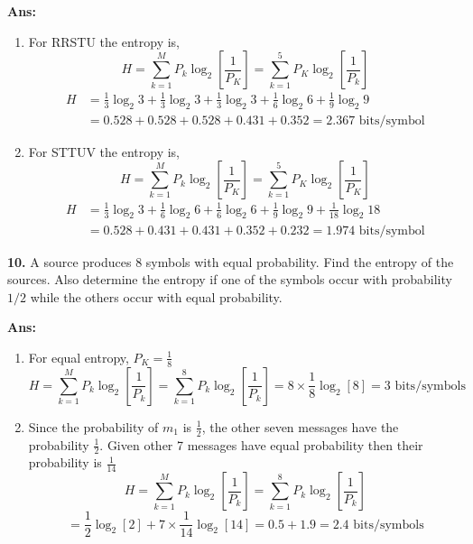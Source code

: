 \documentclass[12pt]{article}
\begin{document}
\textbf{Ans:}
\begin{enumerate}
	\item[i.] For RRSTU the entropy is,
	      $$H = \sum_{k=1}^{M} P_k \log_2 \left[ \frac{1}{P_K} \right] = \sum_{k=1}^{5} P_K \log_2 \left[ \frac{1}{P_k} \right]$$
	      \begin{align*}
		      H & = \frac{1}{3}\log_2 3 + \frac{1}{3}\log_2 3 + \frac{1}{3}\log_2 3 + \frac{1}{6}\log_2 6 + \frac{1}{9}\log_2 9 \\
		        & = 0.528 + 0.528 + 0.528 + 0.431 + 0.352 = 2.367 \text{ bits/symbol}
	      \end{align*}

	\item[ii.] For STTUV the entropy is,
	      $$H = \sum_{k=1}^{M} P_k \log_2 \left[ \frac{1}{P_K} \right] = \sum_{k=1}^{5} P_K \log_2 \left[ \frac{1}{P_K} \right]$$
	      \begin{align*}
		      H & = \frac{1}{3}\log_2 3 + \frac{1}{6}\log_2 6 + \frac{1}{6}\log_2 6 + \frac{1}{9}\log_2 9 + \frac{1}{18}\log_2 18 \\
		        & = 0.528 + 0.431 + 0.431 + 0.352 + 0.232 = 1.974 \text{ bits/symbol}
	      \end{align*}
\end{enumerate}

\vspace{0.5cm}
\noindent \textbf{10.} A source produces 8 symbols with equal probability. Find the entropy of the sources. Also determine the entropy if one of the symbols occur with probability $1/2$ while the others occur with equal probability.

\textbf{Ans:}
\begin{enumerate}
	\item[i.] For equal entropy, $P_K = \frac{1}{8}$
	      $$H = \sum_{k=1}^{M} P_k \log_2 \left[ \frac{1}{P_k} \right] = \sum_{k=1}^{8} P_k \log_2 \left[ \frac{1}{P_k} \right] = 8 \times \frac{1}{8} \log_2[8] = 3 \text{ bits/symbols}$$

	\item[ii.] Since the probability of $m_1$ is $\frac{1}{2}$, the other seven messages have the probability $\frac{1}{2}$. Given other 7 messages have equal probability then their probability is $\frac{1}{14}$
	      $$H = \sum_{k=1}^{M} P_k \log_2 \left[ \frac{1}{P_k} \right] = \sum_{k=1}^{8} P_k \log_2 \left[ \frac{1}{P_k} \right]$$
	      $$= \frac{1}{2}\log_2[2] + 7 \times \frac{1}{14}\log_2[14] = 0.5 + 1.9 = 2.4 \text{ bits/symbols}$$
\end{enumerate}
\end{document}
